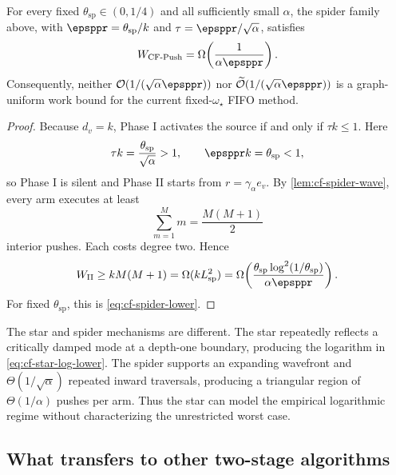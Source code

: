 \begin{theorem}
\label{thm:cf-spider-lower}
For every fixed \(\theta_{\mathrm{sp}}\in(0,1/4)\) and all sufficiently small \(\alpha\), the
spider family above, with \(\epsppr=\theta_{\mathrm{sp}}/k\) and
\(\tau=\epsppr/\sqrt\alpha\), satisfies
\begin{equation}
    W_{\rm CF\text{-}Push}
    =\Omega\!\left(\frac{1}{\alpha\epsppr}\right).
    \label{eq:cf-spider-lower}
\end{equation}
Consequently, neither
\(\mathcal O(1/(\sqrt\alpha\epsppr))\) nor
\(\widetilde{\mathcal O}(1/(\sqrt\alpha\epsppr))\) is a graph-uniform work
bound for the current fixed-\(\omega_\star\) FIFO method.
\end{theorem}

\begin{proof}
Because \(d_v=k\), Phase I activates the source if and only if
\(\tau k\leq1\).  Here
\begin{equation}
    \tau k=\frac{\theta_{\mathrm{sp}}}{\sqrt\alpha}>1,
    \qquad
    \epsppr k=\theta_{\mathrm{sp}}<1,
    \label{eq:cf-spider-bypass}
\end{equation}
so Phase I is silent and Phase II starts from
\(r=\gamma_\alpha e_v\).  By \cref{lem:cf-spider-wave}, every arm executes at
least
\begin{equation}
    \sum_{m=1}^{M}m=\frac{M(M+1)}2
    \label{eq:cf-spider-count-per-arm}
\end{equation}
interior pushes.  Each costs degree two.  Hence
\begin{equation}
    W_{\rm II}
    \geq kM(M+1)
    =\Omega(kL_{\mathrm{sp}}^2)
    =\Omega\!\left(
       \frac{\theta_{\mathrm{sp}}\log^2(1/\theta_{\mathrm{sp}})}{\alpha\epsppr}
      \right).
    \label{eq:cf-spider-work-calculation}
\end{equation}
For fixed \(\theta_{\mathrm{sp}}\), this is \cref{eq:cf-spider-lower}.
\end{proof}

The star and spider mechanisms are different.  The star repeatedly reflects
a critically damped mode at a depth-one boundary, producing the logarithm in
\cref{eq:cf-star-log-lower}.  The spider supports an expanding wavefront and
\(\Theta(1/\sqrt\alpha)\) repeated inward traversals, producing a triangular
region of \(\Theta(1/\alpha)\) pushes per arm.  Thus the star can model the
empirical logarithmic regime without characterizing the unrestricted worst
case.

\subsection{What transfers to other two-stage algorithms}
\label{subsec:cf-two-stage-scope}

